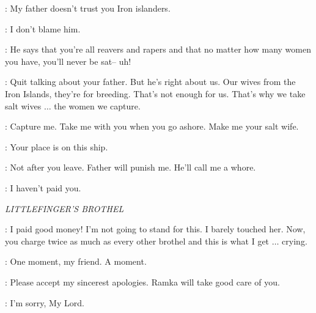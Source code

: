 
\WOMAN: My father doesn't trust you Iron islanders.

\THEON: I don't blame him.

\WOMAN: He says that you're all reavers and rapers and that no matter how many women you have, you'll never be sat-- uh!


\THEON: Quit talking about your father. But he's right about us. Our wives from the Iron Islands, they're for breeding. That's not enough for us. That's why we take salt wives $\ldots$ the women we capture.

\WOMAN: Capture me. Take me with you when you go ashore. Make me your salt wife.

\THEON: Your place is on this ship.

\WOMAN: Not after you leave. Father will punish me. He'll call me a whore.

\THEON: I haven't paid you.



\scene

\textit{LITTLEFINGER'S BROTHEL}


\CLIENT: I paid good money! I'm not going to stand for this. I barely touched her. Now, you charge twice as much as every other brothel and this is what I get $\ldots$ crying.

\LITTLEFINGER: One moment, my friend. A moment.


\LITTLEFINGER: Please accept my sincerest apologies. Ramka will take good care of you.


\ROS: I'm sorry, My Lord.

